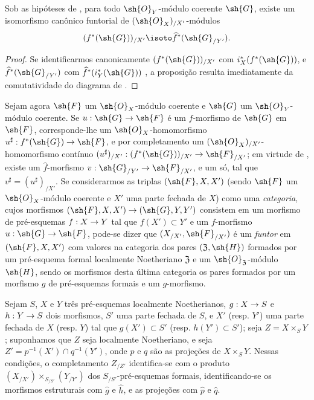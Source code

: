 \documentclass[oneside]{amsart}
\makeatletter
\newcommand{\ega@arrow}[2]{\mathchoice{#1}{#2}{#2}{#2}}
\renewcommand{\to}{\ega@arrow{\longrightarrow}{\rightarrow}}
\newcommand{\oldpage}[2][]{{\marginnote{\normalfont\textbf{#1}~|~#2}}\ignorespaces}
\let\EGAOriginalLabel\label
\renewcommand{\label}[1]{\phantomsection\EGAOriginalLabel{#1}}
\makeatother
\begin{document}
\begin{proposition}[10.9.5]
\label{I.10.9.5}
Sob as hipóteses de , para todo $\sh{O}_Y$-módulo coerente $\sh{G}$, existe um isomorfismo canônico funtorial de $(\sh{O}_X)_{/X'}$-módulos
\[
  (f^*(\sh{G}))_{/X'}\isoto\widehat{f}^*(\sh{G}_{/Y'}).
\]
\end{proposition}

\begin{proof}
Se identificarmos canonicamente $(f^*(\sh{G}))_{/X'}$ com $i_X^*(f^*(\sh{G}))$, e $\widehat{f}^*(\sh{G}_{/Y'})$ com $\widehat{f}^*(i_Y^*(\sh{G}))$ , a proposição resulta imediatamente da comutatividade do diagrama de .
\end{proof}

\begin{env}[10.9.6]
\label{I.10.9.6}
Sejam agora $\sh{F}$ um $\sh{O}_X$-módulo coerente e $\sh{G}$ um $\sh{O}_Y$-módulo coerente.
Se $u:\sh{G}\to\sh{F}$ é um $f$-morfismo de $\sh{G}$ em $\sh{F}$, corresponde-lhe um $\sh{O}_X$-homomorfismo $u^\sharp:f^*(\sh{G})\to\sh{F}$, e por completamento um $(\sh{O}_X)_{/X'}$-homomorfismo contínuo $(u^\sharp)_{/X'}:(f^*(\sh{G}))_{/X'}\to\sh{F}_{/X'}$; em virtude de , existe um $\widehat{f}$-morfismo $v:\sh{G}_{/Y'}\to\sh{F}_{/X'}$,
\oldpage[I]{200}
e um só, tal que $v^\sharp=(u^\sharp)_{/X'}$.
Se considerarmos as triplas $(\sh{F},X,X')$ (sendo $\sh{F}$ um $\sh{O}_X$-módulo coerente e $X'$ uma parte fechada de $X$) como uma \emph{categoria}, cujos morfismos $(\sh{F},X,X')\to(\sh{G},Y,Y')$ consistem em um morfismo de pré-esquemas $f:X\to Y$ tal que $f(X')\subset Y'$ e um $f$-morfismo $u:\sh{G}\to\sh{F}$, pode-se dizer que $(X_{/X'},\sh{F}_{/X'})$ é um \emph{funtor} em $(\sh{F},X,X')$ com valores na categoria dos pares $(\mathfrak{Z},\sh{H})$ formados por um pré-esquema formal localmente Noetheriano $\mathfrak{Z}$ e um $\sh{O}_\mathfrak{Z}$-módulo $\sh{H}$, sendo os morfismos desta última categoria os pares formados por um morfismo $g$ de pré-esquemas formais e um $g$-morfismo.
\end{env}

\begin{proposition}[10.9.7]
\label{I.10.9.7}
Sejam $S$, $X$ e $Y$ três pré-esquemas localmente Noetherianos, $g:X\to S$ e $h:Y\to S$ dois morfismos, $S'$ uma parte fechada de $S$, e $X'$ (resp. $Y'$) uma parte fechada de $X$ (resp. $Y$) tal que $g(X')\subset S'$ (resp. $h(Y')\subset S'$); seja $Z=X\times_S Y$; suponhamos que $Z$ seja localmente Noetheriano, e seja $Z'=p^{-1}(X')\cap q^{-1}(Y')$, onde $p$ e $q$ são as projeções de $X\times_S Y$.
Nessas condições, o completamento $Z_{/Z'}$ identifica-se com o produto $(X_{/X'})\times_{S_{/S'}}(Y_{/Y'})$ dos $S_{/S'}$-pré-esquemas formais, identificando-se os morfismos estruturais com $\widehat{g}$ e $\widehat{h}$, e as projeções com $\widehat{p}$ e $\widehat{q}$.
\end{proposition}
\end{document}
